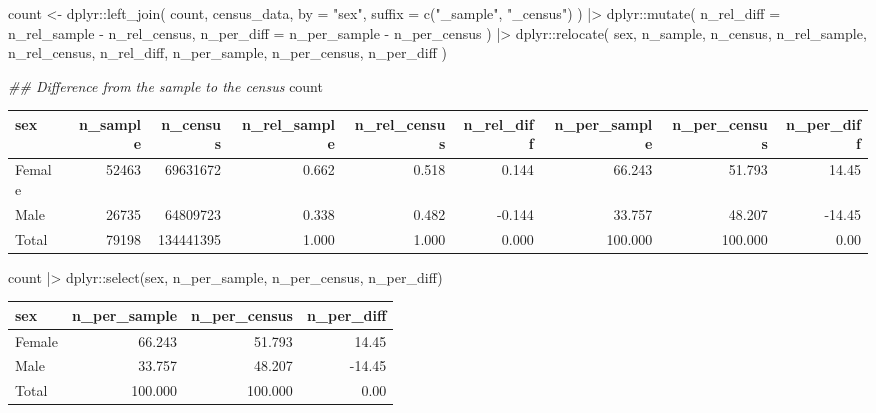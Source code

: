 \documentclass[
  12pt,
  a4paper,
  oneside]{tesesusp}
\newenvironment{Shaded}{\begin{snugshade}}{\end{snugshade}}
\newcommand{\AttributeTok}[1]{\textcolor[rgb]{0.40,0.45,0.13}{#1}}
\newcommand{\DocumentationTok}[1]{\textcolor[rgb]{0.37,0.37,0.37}{\textit{#1}}}
\newcommand{\FunctionTok}[1]{\textcolor[rgb]{0.28,0.35,0.67}{#1}}
\newcommand{\NormalTok}[1]{\textcolor[rgb]{0.00,0.23,0.31}{#1}}
\newcommand{\OtherTok}[1]{\textcolor[rgb]{0.00,0.23,0.31}{#1}}
\newcommand{\SpecialCharTok}[1]{\textcolor[rgb]{0.37,0.37,0.37}{#1}}
\newcommand{\StringTok}[1]{\textcolor[rgb]{0.13,0.47,0.30}{#1}}
\begin{document}
\begin{Shaded}
\begin{Highlighting}[numbers=left,,]
\NormalTok{count }\OtherTok{\textless{}{-}} 
\NormalTok{  dplyr}\SpecialCharTok{::}\FunctionTok{left\_join}\NormalTok{(}
\NormalTok{    count, census\_data, }
    \AttributeTok{by =} \StringTok{"sex"}\NormalTok{, }
    \AttributeTok{suffix =} \FunctionTok{c}\NormalTok{(}\StringTok{"\_sample"}\NormalTok{, }\StringTok{"\_census"}\NormalTok{)}
\NormalTok{  ) }\SpecialCharTok{|\textgreater{}}
\NormalTok{  dplyr}\SpecialCharTok{::}\FunctionTok{mutate}\NormalTok{(}
    \AttributeTok{n\_rel\_diff =}\NormalTok{ n\_rel\_sample }\SpecialCharTok{{-}}\NormalTok{ n\_rel\_census,}
    \AttributeTok{n\_per\_diff =}\NormalTok{ n\_per\_sample }\SpecialCharTok{{-}}\NormalTok{ n\_per\_census}
\NormalTok{  ) }\SpecialCharTok{|\textgreater{}}
\NormalTok{  dplyr}\SpecialCharTok{::}\FunctionTok{relocate}\NormalTok{(}
\NormalTok{    sex, n\_sample, n\_census, n\_rel\_sample, n\_rel\_census, n\_rel\_diff,}
\NormalTok{    n\_per\_sample, n\_per\_census, n\_per\_diff}
\NormalTok{  )}

\DocumentationTok{\#\# Difference from the sample to the census}
\NormalTok{count}
\end{Highlighting}
\end{Shaded}

\begin{table}
\centering
\begin{tabular}{l|r|r|r|r|r|r|r|r}
\hline
sex & n\_sample & n\_census & n\_rel\_sample & n\_rel\_census & n\_rel\_diff & n\_per\_sample & n\_per\_census & n\_per\_diff\\
\hline
Female & 52463 & 69631672 & 0.662 & 0.518 & 0.144 & 66.243 & 51.793 & 14.45\\
\hline
Male & 26735 & 64809723 & 0.338 & 0.482 & -0.144 & 33.757 & 48.207 & -14.45\\
\hline
Total & 79198 & 134441395 & 1.000 & 1.000 & 0.000 & 100.000 & 100.000 & 0.00\\
\hline
\end{tabular}
\end{table}

\begin{Shaded}
\begin{Highlighting}[numbers=left,,]
\NormalTok{count }\SpecialCharTok{|\textgreater{}}\NormalTok{ dplyr}\SpecialCharTok{::}\FunctionTok{select}\NormalTok{(sex, n\_per\_sample, n\_per\_census, n\_per\_diff)}
\end{Highlighting}
\end{Shaded}

\begin{table}
\centering
\begin{tabular}{l|r|r|r}
\hline
sex & n\_per\_sample & n\_per\_census & n\_per\_diff\\
\hline
Female & 66.243 & 51.793 & 14.45\\
\hline
Male & 33.757 & 48.207 & -14.45\\
\hline
Total & 100.000 & 100.000 & 0.00\\
\hline
\end{tabular}
\end{table}
\end{document}
